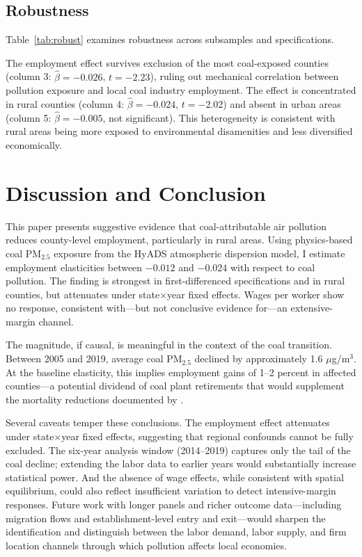 \documentclass[12pt]{article}
\begin{document}
\subsection{Robustness}

Table~\ref{tab:robust} examines robustness across subsamples and specifications.



The employment effect survives exclusion of the most coal-exposed counties (column 3: $\hat{\beta}=-0.026$, $t=-2.23$), ruling out mechanical correlation between pollution exposure and local coal industry employment. The effect is concentrated in rural counties (column 4: $\hat{\beta}=-0.024$, $t=-2.02$) and absent in urban areas (column 5: $\hat{\beta}=-0.005$, not significant). This heterogeneity is consistent with rural areas being more exposed to environmental disamenities and less diversified economically.

\section{Discussion and Conclusion}

This paper presents suggestive evidence that coal-attributable air pollution reduces county-level employment, particularly in rural areas. Using physics-based coal PM$_{2.5}$ exposure from the HyADS atmospheric dispersion model, I estimate employment elasticities between $-0.012$ and $-0.024$ with respect to coal pollution. The finding is strongest in first-differenced specifications and in rural counties, but attenuates under state$\times$year fixed effects. Wages per worker show no response, consistent with---but not conclusive evidence for---an extensive-margin channel.

The magnitude, if causal, is meaningful in the context of the coal transition. Between 2005 and 2019, average coal PM$_{2.5}$ declined by approximately 1.6 $\mu$g/m$^3$. At the baseline elasticity, this implies employment gains of 1--2 percent in affected counties---a potential dividend of coal plant retirements that would supplement the mortality reductions documented by \citet{henneman2023mortality}.

Several caveats temper these conclusions. The employment effect attenuates under state$\times$year fixed effects, suggesting that regional confounds cannot be fully excluded. The six-year analysis window (2014--2019) captures only the tail of the coal decline; extending the labor data to earlier years would substantially increase statistical power. And the absence of wage effects, while consistent with spatial equilibrium, could also reflect insufficient variation to detect intensive-margin responses. Future work with longer panels and richer outcome data---including migration flows and establishment-level entry and exit---would sharpen the identification and distinguish between the labor demand, labor supply, and firm location channels through which pollution affects local economies.
\end{document}
